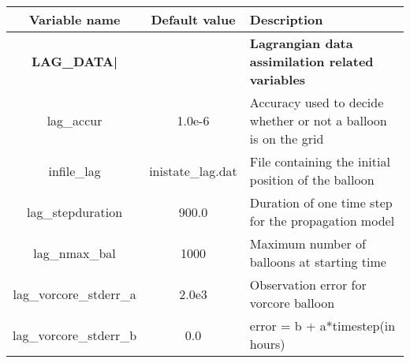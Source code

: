 \begin{table}[h]
 \footnotesize
 \center
 \begin{tabular}{| c | c | p{9cm} |}
 \hline
 Variable name & Default value & Description \\
 \hline
\textbf{LAG\_DATA|} & &  \textbf{Lagrangian data assimilation related variables} \\
 \hline
 lag\_accur	& 1.0e-6 & Accuracy used to decide whether or not a balloon is on the grid \\
 \hline
 infile\_lag & inistate\_lag.dat & File containing the initial position of the balloon \\
 \hline
 lag\_stepduration & 900.0 & Duration of one time step for the propagation model \\
 \hline
 lag\_nmax\_bal & 1000 & Maximum number of balloons at starting time \\
 \hline
 lag\_vorcore\_stderr\_a & 2.0e3 & Observation error for vorcore balloon \\
 \hline
 lag\_vorcore\_stderr\_b & 0.0 & error = b + a*timestep(in hours)\\
 \hline
 \end{tabular}
\end{table}

